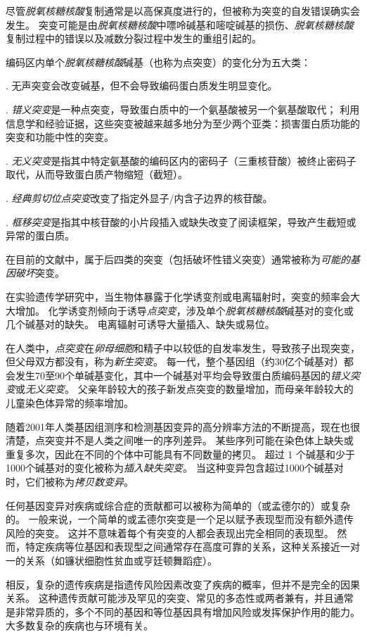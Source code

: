 \begin{proposition}[突变：遗传多样性的起源] \label{box:2_1}
	
	\quad \quad 尽管\textit{脱氧核糖核酸}复制通常是以高保真度进行的，但被称为突变的自发错误确实会发生。
	突变可能是由\textit{脱氧核糖核酸}中嘌呤碱基和嘧啶碱基的损伤、\textit{脱氧核糖核酸}复制过程中的错误以及减数分裂过程中发生的重组引起的。
	
	
	\quad \quad 编码区内单个\textit{脱氧核糖核酸}碱基（也称为点突变）的变化分为五大类：
	
	
	\quad {}. 无声突变会改变碱基，但不会导致编码蛋白质发生明显变化。
	
	
	\quad {}. \textit{错义突变}是一种点突变，导致蛋白质中的一个氨基酸被另一个氨基酸取代；
	利用信息学和经验证据，这些突变被越来越多地分为至少两个亚类：损害蛋白质功能的突变和功能中性的突变。
	
	
	\quad {}. \textit{无义突变}是指其中特定氨基酸的编码区内的密码子（三重核苷酸）被终止密码子取代，从而导致蛋白质产物缩短（截短）。
	
	
	\quad {}. \textit{经典剪切位点突变}改变了指定外显子/内含子边界的核苷酸。
	
	\quad {}. \textit{框移突变}是指其中核苷酸的小片段插入或缺失改变了阅读框架，导致产生截短或异常的蛋白质。
	
	\quad \quad 在目前的文献中，属于后四类的突变（包括破坏性错义突变）通常被称为\textit{可能的基因破坏}突变。
	
	\quad \quad 在实验遗传学研究中，当生物体暴露于化学诱变剂或电离辐射时，突变的频率会大大增加。
	化学诱变剂倾向于诱导\textit{点突变}，涉及单个\textit{脱氧核糖核酸}碱基对的变化或几个碱基对的缺失。
	电离辐射可诱导大量插入、缺失或易位。
	
	\quad \quad 在人类中，\textit{点突变}在\textit{卵母细胞}和精子中以较低的自发率发生，导致孩子出现突变，但父母双方都没有，称为\textit{新生突变}。
	每一代，整个基因组（约30亿个碱基对）都会发生70至90个单碱基变化，其中一个碱基对平均会导致蛋白质编码基因的\textit{错义突变}或\textit{无义突变}。
	父亲年龄较大的孩子新发点突变的数量增加，而母亲年龄较大的儿童染色体异常的频率增加。
	
	
	\quad \quad 随着2001年人类基因组测序和检测基因变异的高分辨率方法的不断提高，现在也很清楚，点突变并不是人类之间唯一的序列差异。
	某些序列可能在染色体上缺失或重复多次，因此在不同的个体中可能具有不同数量的拷贝。
	超过 1 个碱基和少于1000个碱基对的变化被称为\textit{插入缺失突变}。
	当这种变异包含超过1000个碱基对时，它们被称为\textit{拷贝数变异}。
	
	
	\quad \quad 任何基因变异对疾病或综合症的贡献都可以被称为简单的（或孟德尔的）或复杂的。
	一般来说，一个简单的或孟德尔突变是一个足以赋予表现型而没有额外遗传风险的突变。
	这并不意味着每个有突变的人都会表现出完全相同的表现型。
	然而，特定疾病等位基因和表现型之间通常存在高度可靠的关系，这种关系接近一对一的关系（如镰状细胞性贫血或亨廷顿舞蹈症）。
	
	
	\quad \quad 相反，复杂的遗传疾病是指遗传风险因素改变了疾病的概率，但并不是完全的因果关系。
	这种遗传贡献可能涉及罕见的突变、常见的多态性或两者兼有，并且通常是非常异质的，多个不同的基因和等位基因具有增加风险或发挥保护作用的能力。
	大多数复杂的疾病也与环境有关。
	
		
\end{proposition}
